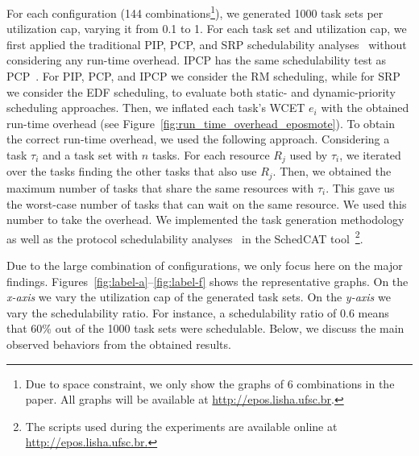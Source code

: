 For each configuration (144 combinations\footnote{Due to space constraint, 
we only show the graphs of 6 combinations in the paper. All graphs will be 
available at \url{http://epos.lisha.ufsc.br}.}), we generated 1000 
task sets per utilization cap, varying it from 0.1 to 1. For each task set and 
utilization cap, we first applied the traditional PIP, PCP, and SRP 
schedulability analyses~\cite{Buttazzo:2011} without considering any run-time 
overhead. IPCP has the same schedulability test as PCP~\cite{Buttazzo:2011}. For 
PIP, PCP, and IPCP we consider the RM scheduling, while for SRP we consider the 
EDF scheduling, to evaluate both static- and dynamic-priority scheduling 
approaches. Then, we inflated each task's WCET $e_i$ with the obtained 
run-time overhead (see Figure~\ref{fig:run_time_overhead_eposmote}). To obtain 
the correct run-time overhead, we used the following approach. Considering a 
task 
$\tau_i$ and a task set with $n$ tasks. For each resource $R_j$ used by 
$\tau_i$, we iterated over the tasks finding the other tasks that also use 
$R_j$. Then, we obtained the maximum number of tasks that share the same 
resources with $\tau_i$. This gave us the worst-case number of tasks that can 
wait on the same resource. We used this number to take the overhead. We 
implemented the task generation methodology as well as the protocol 
schedulability analyses~\cite{Buttazzo:2011} in the SchedCAT 
tool~\cite{schedcat}\footnote{The scripts used during the experiments are 
available online at \url{http://epos.lisha.ufsc.br.}}. 

Due to the large combination of configurations, we only focus here on the major 
findings. Figures~\ref{fig:label-a}--\ref{fig:label-f} shows the 
representative graphs. On the \emph{x-axis} we vary the utilization cap of the 
generated task sets. On the \emph{y-axis} we vary the schedulability ratio. For 
instance, a schedulability ratio of 0.6 means that 60\% out of the 1000 task 
sets were schedulable. Below, we discuss the main observed behaviors from the 
obtained results.

